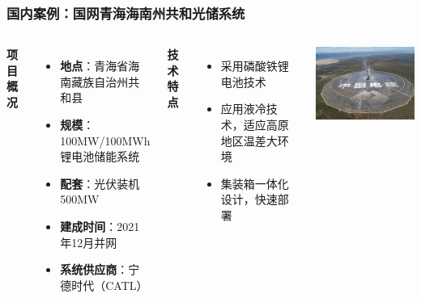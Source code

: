 \documentclass[aspectratio=169]{beamer}
\begin{document}
\begin{frame}
    \frametitle{国内案例：国网青海海南州共和光储系统}
    \begin{columns}
        \textbf{项目概况}
        \begin{itemize}
            \item \textbf{地点}：青海省海南藏族自治州共和县
            \item \textbf{规模}：100MW/100MWh锂电池储能系统
            \item \textbf{配套}：光伏装机500MW
            \item \textbf{建成时间}：2021年12月并网
            \item \textbf{系统供应商}：宁德时代（CATL）
        \end{itemize}
        
        \textbf{技术特点}
        \begin{itemize}
            \item 采用磷酸铁锂电池技术
            \item 应用液冷技术，适应高原地区温差大环境
            \item 集装箱一体化设计，快速部署
        \end{itemize}
        
        \centering
        \includegraphics[width=\textwidth]{fig/青海共和光储项目示意图.jpg}
    \end{columns}
\end{frame}
\end{document}
